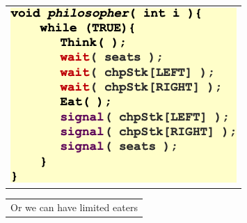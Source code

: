 \documentclass[10pt,landscape,a4paper]{article}
\begin{document}
\begin{multicols*}{4}
  \begin{tabular}{l}
    \includegraphics[width=0.5\linewidth]{limited-eater}
  \end{tabular}
  \begin{tabularx}{0.45\columnwidth}{X}
    Or we can have limited eaters
  \end{tabularx}

  
\end{multicols*}
\end{document}
